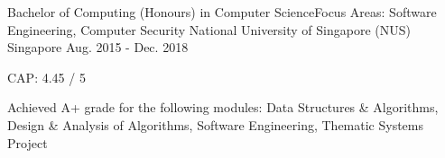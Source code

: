 

\begin{cventries}

  \cventry
    {Bachelor of Computing (Honours) in Computer Science\linebreak Focus Areas: Software Engineering, Computer Security} %
    {National University of Singapore (NUS)} %
    {Singapore} %
    {Aug. 2015 - Dec. 2018} %
    {
      \begin{cvitems} %
        \item {CAP: 4.45 / 5}
        \item {Achieved A+ grade for the following modules: Data Structures \& Algorithms, Design \& Analysis of Algorithms, Software Engineering, Thematic Systems Project}
      \end{cvitems}
    }

\end{cventries}
